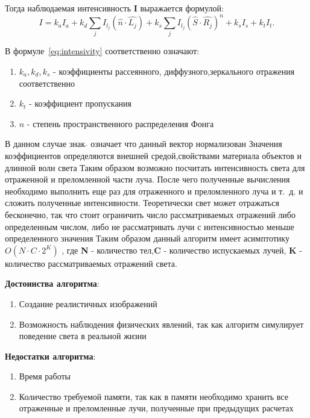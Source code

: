 Тогда наблюдаемая интенсивность \textbf{I} выражается формулой:
\begin{equation} 
	I = k_aI_a + k_d \sum_{j} I_{l_j}(\hat{n} \cdot \hat{L_j}) + k_s \sum_{j} I_{l_j}(\hat{S} \cdot \hat{R_j})^n + k_sI_s + k_tI_t.
	\label{eq:intensivity}
\end{equation}

В формуле~\ref{eq:intensivity} соответственно означают:
\begin{enumerate}
	\item $k_a,k_d,k_s$ - коэффициенты рассеянного, диффузного,зеркального отражения соответственно
	\item $k_t$ - коэффициент пропускания
	\item $n$ - степень пространственного распределения Фонга
\end{enumerate}
В данном случае знак $ \hat{} $  означает что данный вектор нормализован
Значения коэффициентов определяются внешней средой,свойствами материала объектов и длинной волн света
Таким образом возможно посчитать интенсивность света для отраженной и преломленной части луча.
После чего полученные вычисления необходимо выполнить еще раз для отраженного и преломленного луча и т.~д.
и сложить полученные интенсивности.
Теоретически свет может отражаться бесконечно, так что стоит ограничить число рассматриваемых отражений либо определенным числом,
либо не рассматривать лучи с интенсивностью меньше определенного значения
Таким образом данный алгоритм имеет асимптотику $O(N \cdot C \cdot 2^{K})$ , где \textbf{N} - количество тел,\textbf{C} - количество испускаемых лучей,
\textbf{K} - количество рассматриваемых отражений света. \cite{Rodgers}



\textbf{Достоинства алгоритма}:
\begin{enumerate}
	\item Создание реалистичных изображений \cite{SSR,Rodgers,modern_ray_tracing}
	\item Возможность наблюдения физических явлений, так как алгоритм симулирует поведение света в реальной жизни \cite{SSR,Rodgers,modern_ray_tracing}
\end{enumerate}


\textbf{Недостатки алгоритма}:
\begin{enumerate}
	\item Время работы \cite{SSR,Rodgers,modern_ray_tracing}
	\item Количество требуемой памяти, так как в памяти необходимо хранить все отраженные и преломленные лучи, полученные при предыдущих расчетах \cite{SSR,Rodgers,modern_ray_tracing}
\end{enumerate}


